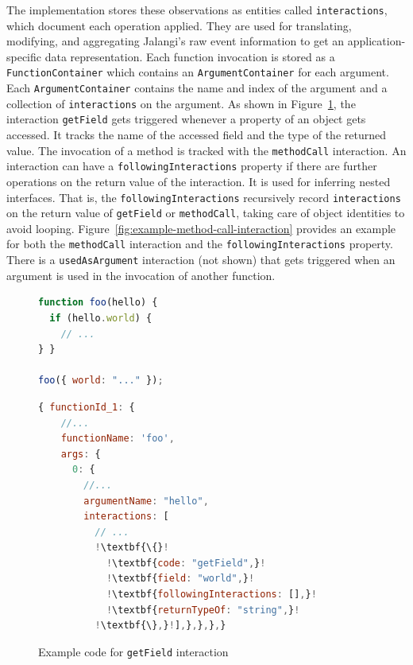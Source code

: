 \documentclass[sigplan,screen]{acmart}
\newcommand{\figref}[1]{Figure~\ref{#1}}
\begin{document}
The implementation stores these observations as entities called
\texttt{interactions}, which document each operation applied. They are used for translating, modifying, and
aggregating Jalangi's raw event information to get an application-specific data representation. Each function invocation is stored as
a \texttt{FunctionContainer} which contains an \texttt{ArgumentContainer} for each argument. Each \texttt{ArgumentContainer} contains 
the name and index of the argument and a collection of
\texttt{interactions} on the argument. As shown in \figref{fig:example-get-field-interaction}, the interaction \texttt{getField} gets triggered whenever 
a property of an object gets accessed. It tracks the name of the
accessed field and the type of the returned value. The invocation of a
method is tracked with the \texttt{methodCall} interaction. An
interaction can have a \texttt{followingInteractions} property if
there are further operations on the return value of the interaction. It is used for inferring nested interfaces.
That is, the \texttt{followingInteractions} recursively record \texttt{interactions} on the return value of \texttt{getField} or 
\texttt{methodCall}, taking care of object identities to avoid
looping. \figref{fig:example-method-call-interaction} provides an
example for both the \texttt{methodCall} interaction 
and the \texttt{followingInteractions} property. There is a
\texttt{usedAsArgument} interaction (not shown) that
gets triggered when an argument is used in the invocation of another function.

\begin{figure}[t]
  \centering
    \begin{lstlisting}[language=JavaScript,numbers=none]
function foo(hello) {
  if (hello.world) {
    // ...
} }

foo({ world: "..." });
    \end{lstlisting}
    \begin{lstlisting}[language=JavaScript,numbers=none,escapechar=!]
{ functionId_1: {
    //...
    functionName: 'foo',
    args: {
      0: {
        //...
        argumentName: "hello",
        interactions: [
          // ...
          !\textbf{\{}!
            !\textbf{code: "getField",}!
            !\textbf{field: "world",}!
            !\textbf{followingInteractions: [],}!
            !\textbf{returnTypeOf: "string",}!
          !\textbf{\},}!],},},},}
    \end{lstlisting}
  \caption{
      Example code for \texttt{getField} interaction
    }
  \label{fig:example-get-field-interaction}
\end{figure}
\end{document}
